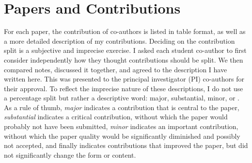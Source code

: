 \section{Papers and Contributions}
For each paper, the contribution of co-authors is listed in table format, as well as a more detailed description of my contributions. Deciding on the contribution split is a subjective and imprecise exercise. I asked each student co-author to first consider independently how they thought contributions should be split. We then compared notes, discussed it together, and agreed to the description I have written here. This was presented to the principal investigator (PI) co-authors for their approval. To reflect the imprecise nature of these descriptions, I do not use a percentage split but rather a descriptive word: major, substantial, minor, or \negligible. As a rule of thumb, \emph{major} indicates a contribution that is central to the paper, \emph{substantial} indicates a critical contribution, without which the paper would probably not have been submitted, \emph{minor} indicates an important contribution, without which the paper quality would be significantly diminished and possibly not accepted, and finally \emph{\negligible} indicates contributions that improved the paper, but did not significantly change the form or content.


